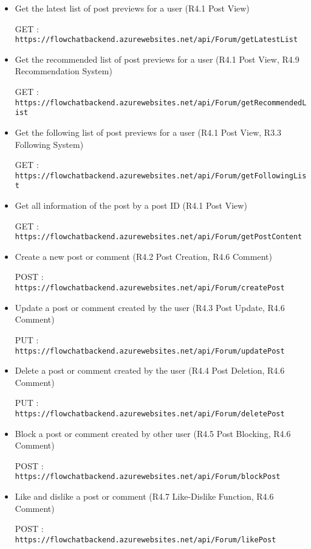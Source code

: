 \documentclass[11pt, a4paper]{article}
\begin{document}
\begin{itemize}
\item Get the latest list of post previews for a user (R4.1 Post View)

GET :  \texttt{https://flowchatbackend.azurewebsites.net/api/Forum/getLatestList}

\item Get the recommended list of post previews for a user (R4.1 Post View, R4.9 Recommendation System)

GET :  \texttt{https://flowchatbackend.azurewebsites.net/api/Forum/getRecommendedList}

\item Get the following list of post previews for a user (R4.1 Post View, R3.3 Following System)

GET :  \texttt{https://flowchatbackend.azurewebsites.net/api/Forum/getFollowingList}

\item Get all information of the post by a post ID (R4.1 Post View)

GET :  \texttt{https://flowchatbackend.azurewebsites.net/api/Forum/getPostContent}

\item Create a new post or comment (R4.2 Post Creation, R4.6 Comment)

POST :  \texttt{https://flowchatbackend.azurewebsites.net/api/Forum/createPost}

\item Update a post or comment created by the user (R4.3 Post Update, R4.6 Comment)

PUT :  \texttt{https://flowchatbackend.azurewebsites.net/api/Forum/updatePost}

\item Delete a post or comment created by the user (R4.4 Post Deletion, R4.6 Comment)

PUT :  \texttt{https://flowchatbackend.azurewebsites.net/api/Forum/deletePost}

\item Block a post or comment created by other user (R4.5 Post Blocking, R4.6 Comment)

POST :  \texttt{https://flowchatbackend.azurewebsites.net/api/Forum/blockPost}

\item Like and dislike a post or comment (R4.7 Like-Dislike Function, R4.6 Comment)

POST :  \texttt{https://flowchatbackend.azurewebsites.net/api/Forum/likePost}


\end{itemize}
\end{document}
